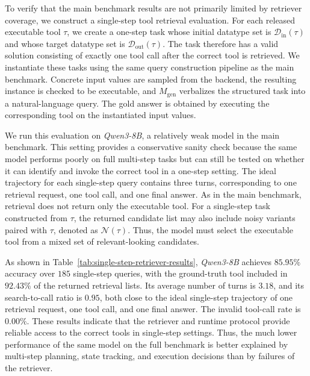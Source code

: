 \documentclass{llmxive}
\begin{document}

To verify that the main benchmark results are not primarily limited by retriever coverage, we construct a single-step tool retrieval evaluation. 
For each released executable tool $\tau$, we create a one-step task whose initial datatype set is $\mathcal{D}_{\mathrm{in}}(\tau)$ and whose target datatype set is $\mathcal{D}_{\mathrm{out}}(\tau)$.
The task therefore has a valid solution consisting of exactly one tool call after the correct tool is retrieved. 
We instantiate these tasks using the same query construction pipeline as the main benchmark. 
Concrete input values are sampled from the backend, the resulting instance is checked to be executable, and $M_{\mathrm{gen}}$ verbalizes the structured task into a natural-language query. 
The gold answer is obtained by executing the corresponding tool on the instantiated input values.

We run this evaluation on \textit{Qwen3-8B}, a relatively weak model in the main benchmark. 
This setting provides a conservative sanity check because the same model performs poorly on full multi-step tasks but can still be tested on whether it can identify and invoke the correct tool in a one-step setting. 
The ideal trajectory for each single-step query contains three turns, corresponding to one retrieval request, one tool call, and one final answer.
As in the main benchmark, retrieval does not return only the executable tool.
For a single-step task constructed from $\tau$, the returned candidate list may also include noisy variants paired with $\tau$, denoted as $\mathcal{N}(\tau)$.
Thus, the model must select the executable tool from a mixed set of relevant-looking candidates.

As shown in Table~\ref{tab:single-step-retriever-results}, \textit{Qwen3-8B} achieves $85.95\%$ accuracy over $185$ single-step queries, with the ground-truth tool included in $92.43\%$ of the returned retrieval lists.
Its average number of turns is $3.18$, and its search-to-call ratio is $0.95$, both close to the ideal single-step trajectory of one retrieval request, one tool call, and one final answer.
The invalid tool-call rate is $0.00\%$.
These results indicate that the retriever and runtime protocol provide reliable access to the correct tools in single-step settings. 
Thus, the much lower performance of the same model on the full benchmark is better explained by multi-step planning, state tracking, and execution decisions than by failures of the retriever.
\end{document}
